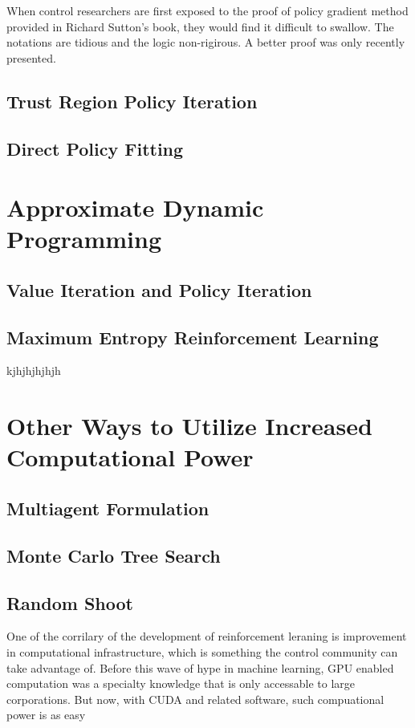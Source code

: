 \documentclass[journal]{IEEEtran}
\begin{document}
When control researchers are first exposed to the proof of policy gradient method provided in Richard Sutton's book, they would find it difficult to swallow. The notations are tidious and the logic non-rigirous. A better proof was only recently presented. \cite{Schulman2015TrustRP}



\subsection{Trust Region Policy Iteration}
\subsection{Direct Policy Fitting}

\section{Approximate Dynamic Programming}









\subsection{Value Iteration and Policy Iteration}
\subsection{Maximum Entropy Reinforcement Learning}


kjhjhjhjhjh






\section{Other Ways to Utilize Increased Computational Power}
\subsection{Multiagent Formulation}
\subsection{Monte Carlo Tree Search}



\subsection{Random Shoot}
One of the corrilary of the development of reinforcement leraning is improvement in computational infrastructure, which is something the control community can take advantage of. Before this wave of hype in machine learning, GPU enabled computation was a specialty knowledge that is only accessable to large corporations. But now, with CUDA and related software, such compuational power is as easy
\end{document}
